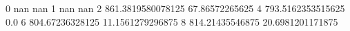 0 nan nan
1 nan nan
2 861.3819580078125 67.86572265625
4 793.5162353515625 0.0
6 804.67236328125 11.1561279296875
8 814.21435546875 20.6981201171875
